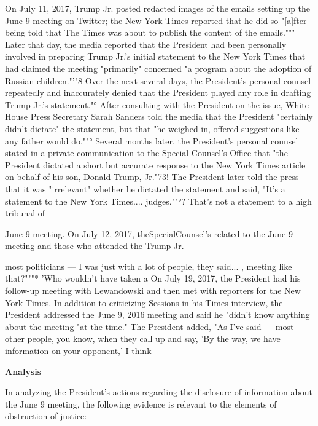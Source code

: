 On July 11, 2017, Trump Jr. posted redacted images of the emails setting up the June 9 meeting on Twitter; the New York Times reported that he did so "[a]fter being told that The Times was about to publish the content of the emails."""
Later that day, the media reported that the President had been personally involved in preparing Trump Jr.'s initial statement to the New York Times that had claimed the meeting "primarily" concerned "a program about the adoption of Russian children."'"8
Over the next several days, the President's personal counsel repeatedly and inaccurately denied that the President played any role in drafting Trump Jr.'s statement."°
After consulting with the President on the issue, White House Press Secretary Sarah Sanders told the media that the President "certainly didn't dictate" the statement, but that "he weighed in, offered suggestions like any father would do.""°
Several months later, the President's personal counsel stated in a private communication to the Special Counsel's Office that "the President dictated a short but accurate response to the New York Times article on behalf of his son, Donald Trump,
Jr."73!
The President later told the press that it was "irrelevant" whether he dictated the statement and said, "It's a statement to the New York Times.... judges.""°?
That's not a statement to a high tribunal of

June 9 meeting.
On July 12, 2017, theSpecialCounsel's
related to the June 9 meeting and those who attended the
Trump Jr.

most politicians — I was just with a lot of people, they said... , meeting like that?"""*
'Who wouldn't have taken a
On July 19, 2017, the President had his follow-up meeting with Lewandowski and then met with reporters for the New York Times.
In addition to criticizing Sessions in his Times interview, the President addressed the June 9, 2016 meeting and said he "didn't know anything about the meeting "at the time."
The President added, "As I've said — most other people, you know, when they call up and say, 'By the way, we have information on your opponent,' I think

\begin{center}
\textbf{Analysis}
\end{center}

In analyzing the President's actions regarding the disclosure of information about the June 9 meeting, the following evidence is relevant to the elements of obstruction of justice:

